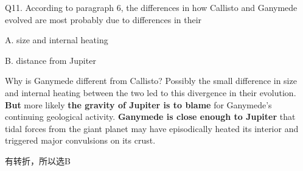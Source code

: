 \begin{blk}
    \begin{qst}
        Q11. According to paragraph 6, the differences in how Callisto and Ganymede evolved are most probably due to differences in their
    \end{qst}

    \begin{chc}
        A. size and internal heating

        B. distance from Jupiter
    \end{chc}

    \begin{psgq}
        Why is Ganymede different from Callisto? Possibly the small difference in size and internal heating between the two led to this divergence in their evolution. \textbf{But} more likely \textbf{the gravity of Jupiter is to blame} for Ganymede’s continuing geological activity. \textbf{Ganymede is close enough to Jupiter} that tidal forces from the giant planet may have episodically heated its interior and triggered major convulsions on its crust.
    \end{psgq}

    \begin{nlz}
        有转折，所以选B
    \end{nlz}
\end{blk}

\newpage